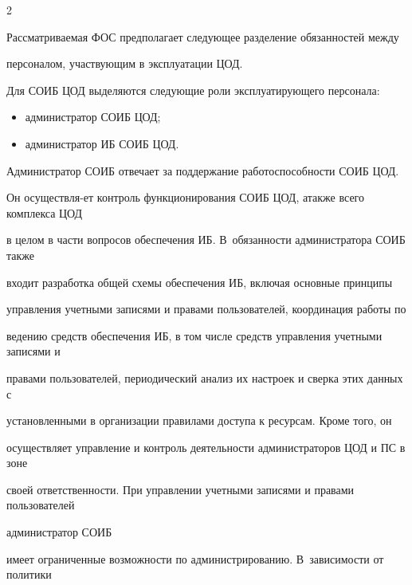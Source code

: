 \begin{multicols}{2}
\begin{figure}


\end{figure}


       


       Рассматриваемая ФОС предполагает следующее разделение обязанностей между 


персоналом, участвующим в эксплуатации ЦОД.


       


       Для СОИБ ЦОД выделяются следующие роли эксплуатирующего персонала:


       \begin{itemize}


\item администратор СОИБ ЦОД;


\item администратор ИБ СОИБ ЦОД.


\end{itemize}





       Администратор СОИБ отвечает за поддержание работоспособности СОИБ ЦОД. 


Он осуществля-\linebreak ет контроль функционирования СОИБ ЦОД, а\linebreak также всего комплекса ЦОД 


в целом в части вопросов обеспечения ИБ. В~обязанности администратора СОИБ также 


входит разработка общей схемы обеспечения ИБ, включая основные принципы 


управления учетными записями и правами пользователей, координация работы по 


ведению средств обеспечения ИБ, в том числе средств управления учетными записями и 


правами пользователей, периодический анализ их настроек и сверка этих данных с 


уста\-нов\-лен\-ны\-ми в организации правилами доступа к ресурсам. Кроме того, он 


осуществляет управ\-ле\-ние и контроль деятельности администраторов ЦОД и ПС в зоне 


своей ответственности. При управлении учетными записями и правами пользователей 


администратор СОИБ


имеет ограниченные возможности по администрированию. В~зависи\-мости от политики 



\end{multicols}

